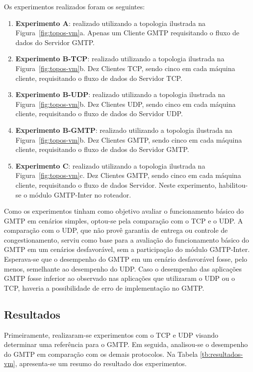 Os experimentos realizados foram os seguintes:
\begin{enumerate}
\item \textbf{Experimento A}: realizado utilizando a topologia ilustrada na Figura~\ref{fig:topos-vm}a. Apenas um Cliente GMTP requisitando o fluxo de dados do Servidor GMTP.
\item \textbf{Experimento B-TCP}: realizado utilizando a topologia ilustrada na Figura~\ref{fig:topos-vm}b.
Dez Clientes TCP, sendo cinco em cada máquina cliente, requisitando o fluxo de dados do Servidor TCP.
\item \textbf{Experimento B-UDP}: realizado utilizando a topologia ilustrada na Figura~\ref{fig:topos-vm}b.
Dez Clientes UDP, sendo cinco em cada máquina cliente, requisitando o fluxo de dados do Servidor UDP.
\item \textbf{Experimento B-GMTP}: realizado utilizando a topologia ilustrada na Figura~\ref{fig:topos-vm}b.
Dez Clientes GMTP, sendo cinco em cada máquina cliente, requisitando o fluxo de dados do Servidor GMTP.
\item \textbf{Experimento C}: realizado utilizando a topologia ilustrada na Figura~\ref{fig:topos-vm}c.
Dez Clientes GMTP, sendo cinco em cada máquina cliente, requisitando o fluxo de dados Servidor. Neste experimento, habilitou-se o módulo GMTP-Inter no roteador.
\end{enumerate}

Como os experimentos tinham como objetivo avaliar o funcionamento básico do GMTP em cenários simples, optou-se pela comparação com o TCP e o UDP. 
A comparação com o UDP, que não provê garantia de entrega ou controle de congestionamento, serviu como base para a avaliação do funcionamento básico do GMTP em um cenários desfavorável, sem a participação do módulo GMTP-Inter.
Esperava-se que o desempenho do GMTP em um cenário desfavorável fosse, pelo menos, semelhante ao desempenho do UDP. 
Caso o desempenho das aplicações GMTP fosse inferior ao observado nas aplicações que utilizaram o UDP ou o TCP, haveria a possibilidade de erro de implementação no GMTP.

\subsection{Resultados}
\label{subsec:resultados-vm}

Primeiramente, realizaram-se experimentos com o TCP e UDP visando determinar uma referência para o GMTP. 
Em seguida, analisou-se o desempenho do GMTP em comparação com os demais protocolos.
Na Tabela \ref{tb:resultados-vm}, apresenta-se um resumo do resultado dos experimentos.


